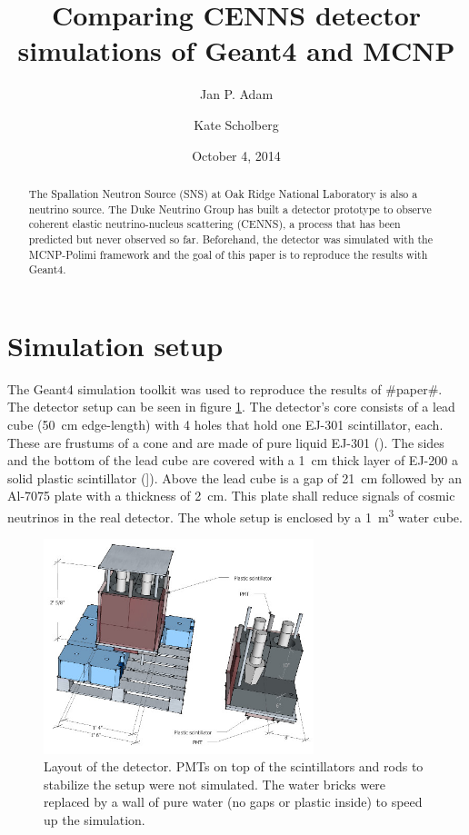 \documentclass[12pt]{article}
\begin{document}
 

\title{Comparing CENNS detector simulations of Geant4 and MCNP} 

\author[1]{Jan P. Adam} 
\author[2]{Kate Scholberg} 
\date{October 4, 2014} 

\maketitle
\begin{abstract}
The Spallation Neutron Source (SNS) at Oak Ridge National Laboratory is also a neutrino source. The Duke Neutrino Group has built a detector prototype to observe coherent elastic neutrino-nucleus scattering (CENNS), a process that has been predicted but never observed so far. Beforehand, the detector was simulated with the MCNP-Polimi framework and the goal of this paper is to reproduce the results with Geant4.
\end{abstract}
\newpage

\section{Simulation setup}

The Geant4 simulation toolkit was used to reproduce the results of \#paper\#. The detector setup can be seen in figure \ref{fig:detector}. The detector's core consists of a lead cube (\SI{50}{cm} edge-length) with 4 holes that hold one EJ-301 scintillator, each. These are frustums of a cone and are made of pure liquid EJ-301 (). The sides and the bottom of the lead cube are covered with a \SI{1}{cm} thick layer of EJ-200 a solid plastic scintillator (]). Above the lead cube is a gap of \SI{21}{cm} followed by an Al-7075 plate with a thickness of \SI{2}{cm}. This plate shall reduce signals of cosmic neutrinos in the real detector. The whole setup is enclosed by a \SI{1}{m^3} water cube.

\begin{figure}[htbp]
	\centering
	\includegraphics[width=0.7\textwidth]{./pics/Det2.jpg}
	\caption{Layout of the detector. PMTs on top of the scintillators and rods to stabilize the setup were not simulated. The water bricks were replaced by a wall of pure water (no gaps or plastic inside) to speed up the simulation. }
	\label{fig:detector}
\end{figure}
\end{document}
